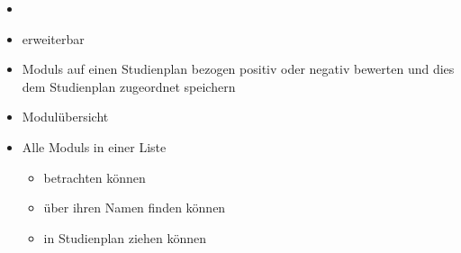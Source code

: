 \begin{itemize}[nosep]
\begin{itemize}[nosep]
\begin{itemize}[nosep]
			\item Sind alle \glspl{Constraint} erfüllt?
		\end{itemize}
	\end{itemize}
	\item {}
	\item {} erweiterbar	 
	\item \glspl{Modul} auf einen \gls{Studienplan} bezogen positiv oder negativ bewerten und dies dem \gls{Studienplan} zugeordnet speichern
	\item Modulübersicht
		\item Alle \glspl{Modul} in einer Liste
			\begin{itemize}[nosep]
				\item betrachten können
				\item über ihren Namen finden können
				\item in \gls{Studienplan} ziehen können
			\end{itemize}
\end{itemize}

